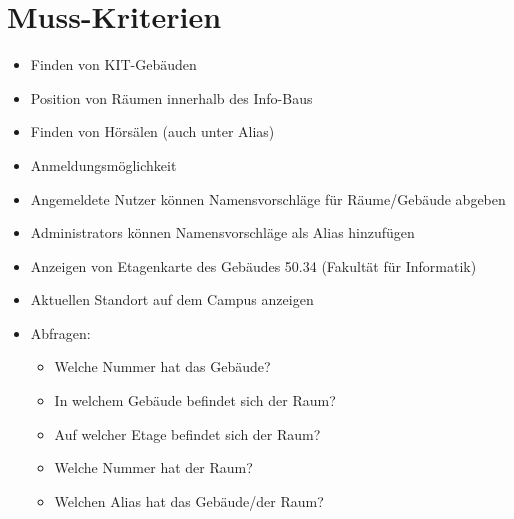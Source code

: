 \section{Muss-Kriterien}

\begin{itemize}

    \item Finden von KIT-Gebäuden
    \item Position von Räumen innerhalb des Info-Baus
    \item Finden von Hörsälen (auch unter Alias)
    \item Anmeldungsmöglichkeit
    \item Angemeldete Nutzer können Namensvorschläge für Räume/Gebäude abgeben
    \item \Glspl{Administrator} können Namensvorschläge als \Gls{Alias} hinzufügen
    \item Anzeigen von \Gls{Etagenkarte} des Gebäudes 50.34 (Fakultät für Informatik)
    \item Aktuellen Standort auf dem \Gls{Campus} anzeigen
    \item Abfragen:
        \begin{itemize}
            \item Welche Nummer hat das Gebäude?
            \item In welchem Gebäude befindet sich der Raum?
            \item Auf welcher Etage befindet sich der Raum?
            \item Welche Nummer hat der Raum?
            \item Welchen \Gls{Alias} hat das Gebäude/der Raum?
        \end{itemize}

\end{itemize}
